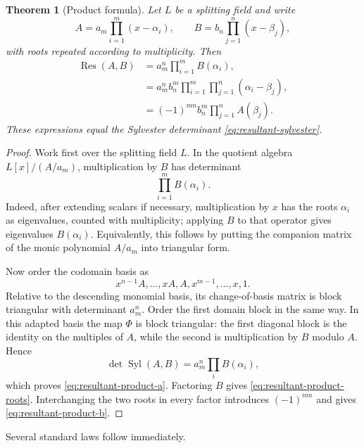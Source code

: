 \documentclass[11pt]{book}
\newtheorem{theorem}{Theorem}[section]
\theoremstyle{definition}
\begin{document}
\begin{theorem}[Product formula]\label{thm:resultant-product-formula}
Let $L$ be a splitting field and write
\[
 A=a_m\prod_{i=1}^{m}(x-\alpha_i),
 \qquad
 B=b_n\prod_{j=1}^{n}(x-\beta_j),
\]
with roots repeated according to multiplicity.  Then
\begin{align}
 \operatorname{Res}(A,B)
 &=a_m^n\prod_{i=1}^{m}B(\alpha_i),
 \label{eq:resultant-product-a}\\
 &=a_m^n b_n^m
   \prod_{i=1}^{m}\prod_{j=1}^{n}(\alpha_i-\beta_j),
 \label{eq:resultant-product-roots}\\
 &=(-1)^{mn}b_n^m\prod_{j=1}^{n}A(\beta_j).
 \label{eq:resultant-product-b}
\end{align}
These expressions equal the Sylvester determinant
\eqref{eq:resultant-sylvester}.
\end{theorem}

\begin{proof}
Work first over the splitting field $L$.  In the quotient algebra
$L[x]/(A/a_m)$, multiplication by $B$ has determinant
\[
 \prod_{i=1}^{m}B(\alpha_i).
\]
Indeed, after extending scalars if necessary, multiplication by $x$ has the
roots $\alpha_i$ as eigenvalues, counted with multiplicity; applying $B$ to
that operator gives eigenvalues $B(\alpha_i)$.  Equivalently, this follows by
putting the companion matrix of the monic polynomial $A/a_m$ into triangular
form.

Now order the codomain basis as
\[
 x^{n-1}A,\ldots,xA,A,x^{m-1},\ldots,x,1.
\]
Relative to the descending monomial basis, its change-of-basis matrix is
block triangular with determinant $a_m^n$.  Order the first domain block in
the same way.  In this adapted basis the map $\Phi$ is block triangular: the
first diagonal block is the identity on the multiples of $A$, while the second
is multiplication by $B$ modulo $A$.  Hence
\[
 \det\operatorname{Syl}(A,B)
 =a_m^n\prod_iB(\alpha_i),
\]
which proves \eqref{eq:resultant-product-a}.  Factoring $B$ gives
\eqref{eq:resultant-product-roots}.  Interchanging the two roots in every
factor introduces $(-1)^{mn}$ and gives
\eqref{eq:resultant-product-b}.
\end{proof}

Several standard laws follow immediately.
\end{document}
